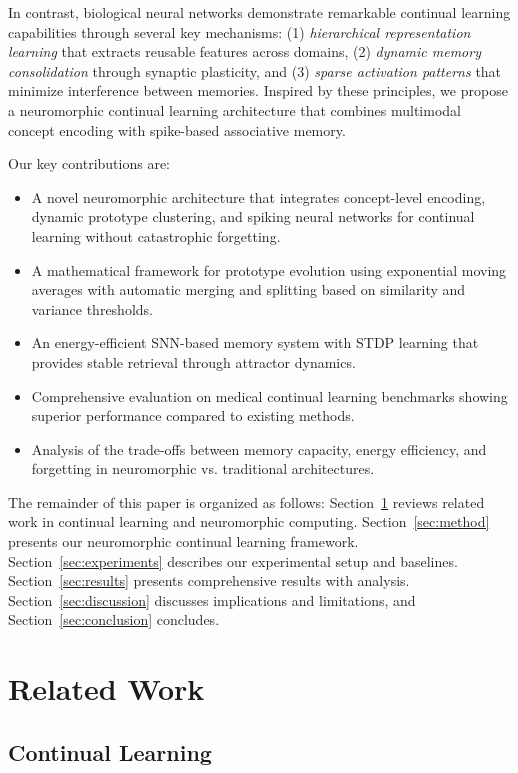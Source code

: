 \documentclass{article}
\begin{document}
In contrast, biological neural networks demonstrate remarkable continual learning capabilities through several key mechanisms: (1) \emph{hierarchical representation learning} that extracts reusable features across domains, (2) \emph{dynamic memory consolidation} through synaptic plasticity, and (3) \emph{sparse activation patterns} that minimize interference between memories. Inspired by these principles, we propose a neuromorphic continual learning architecture that combines multimodal concept encoding with spike-based associative memory.

Our key contributions are:

\begin{itemize}
\item A novel neuromorphic architecture that integrates concept-level encoding, dynamic prototype clustering, and spiking neural networks for continual learning without catastrophic forgetting.
\item A mathematical framework for prototype evolution using exponential moving averages with automatic merging and splitting based on similarity and variance thresholds.
\item An energy-efficient SNN-based memory system with STDP learning that provides stable retrieval through attractor dynamics.
\item Comprehensive evaluation on medical continual learning benchmarks showing superior performance compared to existing methods.
\item Analysis of the trade-offs between memory capacity, energy efficiency, and forgetting in neuromorphic vs. traditional architectures.
\end{itemize}

The remainder of this paper is organized as follows: Section~\ref{sec:related} reviews related work in continual learning and neuromorphic computing. Section~\ref{sec:method} presents our neuromorphic continual learning framework. Section~\ref{sec:experiments} describes our experimental setup and baselines. Section~\ref{sec:results} presents comprehensive results with analysis. Section~\ref{sec:discussion} discusses implications and limitations, and Section~\ref{sec:conclusion} concludes.

\section{Related Work}
\label{sec:related}

\subsection{Continual Learning}
\end{document}
